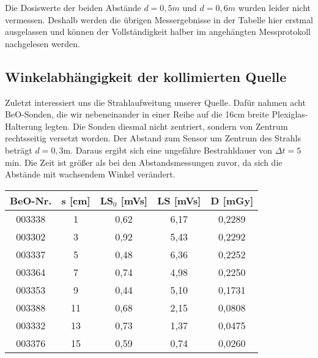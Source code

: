 Die Dosiswerte der beiden Abstände $d = 0,5m$ und $d = 0,6m$ wurden leider nicht vermessen. Deshalb werden die übrigen Messergebnisse in der Tabelle hier erstmal ausgelassen und können der Vollständigkeit halber im angehängten Messprotokoll nachgelesen werden.

\subsection{Winkelabhängigkeit der kollimierten Quelle}

Zuletzt interessiert uns die Strahlaufweitung unserer Quelle. Dafür nahmen acht BeO-Sonden, die wir nebeneinander in einer Reihe auf die 16cm breite Plexiglas-Halterung legten. Die Sonden diesmal nicht zentriert, sondern von Zentrum rechtsseitig versetzt worden. Der Abstand zum Sensor um Zentrum des Strahls beträgt $d = 0,3$m. Daraus ergibt sich eine ungefähre Bestrahldauer von $\Delta t = 5$min. Die Zeit ist größer als bei den Abstandsmessungen zuvor, da sich die Abstände mit wachsendem Winkel verändert.

\vspace{5mm}
\minipanf
	\begin{center}
		\begin{tabular}{c|c|c|c|c}
		\textbf{BeO-Nr.}& \textbf{s} [cm] & \textbf{LS$_0$} [mVs] & \textbf{LS} [mVs] & \textbf{D} [mGy] \\
		 \hline 003338 &  1 & 0,62 & 6,17 & 0,2289 \\
			003302 &  3 & 0,92 & 5,43 & 0,2292 \\
			003337 &  5 & 0,48 & 6,36 & 0,2252 \\
			003364 &  7 & 0,74 & 4,98 & 0,2250 \\
			003353 &  9 & 0,44 & 5,10 & 0,1731 \\
			003388 & 11 & 0,68 & 2,15 & 0,0808 \\
			003332 & 13 & 0,73 & 1,37 & 0,0475 \\
			003376 & 15 & 0,59 & 0,74 & 0,0260 \\
		\end{tabular}
        \label{dft:Aufweitung}
	\end{center} 
\minipend
\vspace{5mm}
